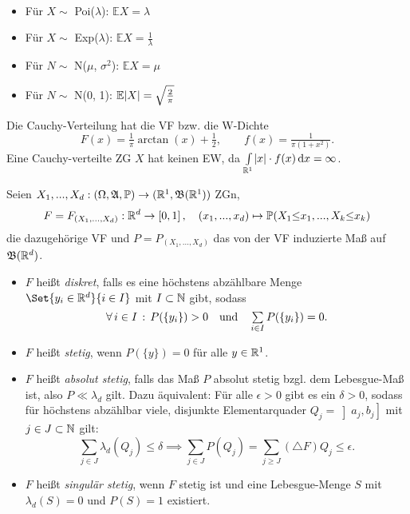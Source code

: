 \documentclass{cheat-sheet}
\newcommand{\Alg}{\mathfrak{A}} %
\renewcommand{\P}{\mathbb{P}} %
\newcommand{\E}{\mathbb{E}} %
\newcommand{\Bor}{\mathfrak{B}} %
\begin{document}

\begin{satz}\mbox{}\\[10pt]
  \begin{multicols}{2}
    \begin{itemize}
      \item Für $X \sim$ Poi($\lambda$): $\E X = \lambda$
      \item Für $X \sim$ Exp($\lambda$): $\E X = \tfrac{1}{\lambda}$
      \item Für $N \sim$ N($\mu$, $\sigma^2$): $\E X = \mu$
      \item Für $N \sim$ N(0, 1): $\E \abs{X} = \sqrt{\tfrac{2}{\pi}}$
    \end{itemize}
  \end{multicols}
\end{satz}

\begin{bem}
  Die Cauchy-Verteilung hat die VF bzw. die W-Dichte
  \[ F(x) = \tfrac{1}{\pi} \arctan(x) + \tfrac{1}{2}, \qquad f(x) = \tfrac{1}{\pi (1 + x^2)}. \]
  Eine Cauchy-verteilte ZG $X$ hat keinen EW, da ${\textstyle \int\limits_{\mathbb{R}^1}^{}} \lvert x\rvert \cdot f(x) \,\mathrm{d} x = \infty$.
\end{bem}

\begin{defn}
  Seien $X_1, ..., X_d : (\Omega, \Alg, \P) \to (\R^1, \Bor(\R^1))$ ZGn,
  \[ F = F_{(X_1, ..., X_d)} : \R^d \to \left[ 0, 1 \right], \quad (x_1, ..., x_d) \mapsto \P(X_1 {\leq} x_1, ..., X_k {\leq} x_k) \]
  die dazugehörige VF und $P = P_{(X_1, ..., X_d)}$ das von der VF induzierte Maß auf $\Bor(\R^d)$.
  \begin{itemize}
    \item $F$ heißt \emph{diskret}, falls es eine höchstens abzählbare Menge $\Set{ y_i \in \R^d }{ i \in I }$ mit $I \subset \mathbb{N}$ gibt, sodass
    \[ \fa{i \in I} P(\{ y_i \}) > 0 \quad \text{und} \quad \sum_{i \in I} P(\{ y_i \}) = 0. \]
    \item $F$ heißt \emph{stetig}, wenn $P(\{ y \}) = 0$ für alle $y \in \mathbb{R}^1$.
    \item $F$ heißt \emph{absolut stetig}, falls das Maß $P$ absolut stetig bzgl. dem Lebesgue-Maß ist, also $P \ll \lambda_d$ gilt. Dazu äquivalent: Für alle $\epsilon > 0$ gibt es ein $\delta > 0$, sodass für höchstens abzählbar viele, disjunkte Elementarquader $Q_{j} = \left] a_j, b_j \right]$ mit $j \in J \subset \mathbb{N}$  gilt:
    \[ \sum_{j \in J} \lambda_d(Q_j) \leq \delta \implies \sum_{j \in J} P(Q_j) = \sum_{j \geq J} (\triangle F) Q_j \leq \epsilon. \]
    \item $F$ heißt \emph{singulär stetig}, wenn $F$ stetig ist und eine Lebesgue-Menge $S$ mit $\lambda_d(S) = 0$ und $P(S) = 1$ existiert.
  \end{itemize}
\end{defn}
\end{document}
